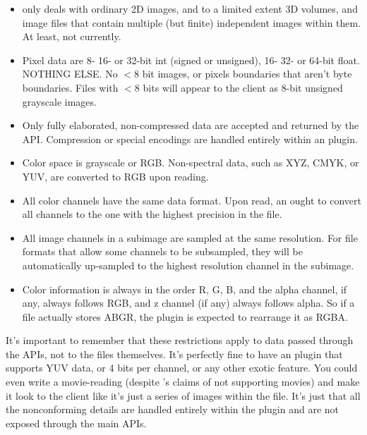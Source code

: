 \begin{itemize}
  \item \product only deals with ordinary 2D images, and to a limited
    extent 3D volumes, and image files that contain multiple (but
    finite) independent images within them.    At least, not currently.

  \item Pixel data are 8- 16- or 32-bit int (signed or unsigned), 16-
    32- or 64-bit float.  NOTHING ELSE.  No $<8$ bit images, or pixels
    boundaries that aren't byte boundaries.  Files with $<8$ bits will
    appear to the client as 8-bit unsigned grayscale images.

  \item Only fully elaborated, non-compressed data are accepted
    and returned by the API.  Compression or special encodings are
    handled entirely within an \product plugin.

  \item Color space is grayscale or RGB.  Non-spectral data, such as
    XYZ, CMYK, or YUV, are converted to RGB upon reading.\

  \item All color channels have the same data format.  Upon read, an
    \ImageInput ought to convert all channels to the one with the highest
    precision in the file.

  \item All image channels in a subimage are sampled at the same
    resolution.  For file formats that allow some channels to be
    subsampled, they will be automatically up-sampled to the highest
    resolution channel in the subimage.

  \item Color information is always in the order R, G, B, and the alpha
    channel, if any, always follows RGB, and z channel (if any) always
    follows alpha.  So if a file actually stores ABGR, the plugin is
    expected to rearrange it as RGBA.

\end{itemize}

It's important to remember that these restrictions apply to data passed
through the APIs, not to the files themselves.  It's perfectly fine to
have an \product plugin that supports YUV data, or 4 bits per channel, or
any other exotic feature.  You could even write a movie-reading
\ImageInput (despite \product's claims of not supporting movies) and
make it look to the client like it's just a series of images within the
file.  It's just that all the nonconforming details are handled entirely
within the \product plugin and are not exposed through the main \product
APIs.


